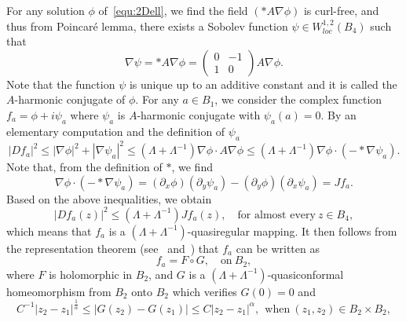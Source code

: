 \documentclass[a4paper,reqno]{amsart}
\theoremstyle{definition}
\numberwithin{equation}{section}
\begin{document}
    For any solution $\phi$ of~\eqref{equ:2Dell}, we find  the field $(*A\nabla \phi)$ is curl-free, and thus from Poincar\'e lemma, there exists a Sobolev function $\psi\in W_{loc}^{1,2}(B_{4})$ such that 
    \begin{equation*}
        \nabla \psi= *A\nabla \phi=\begin{pmatrix}
            0 &-1\\
            1 &0
        \end{pmatrix}A\nabla \phi.
        \end{equation*}
    Note that the function $\psi$ is unique up to an additive constant and it is called the $A$-harmonic conjugate of $\phi$.
    For any $a\in B_{1}$,
    we consider the complex function $f_{a}=\phi+i\psi_{a}$ where $\psi_{a}$ is $A$-harmonic conjugate with $\psi_{a}(a)=0$. By an elementary computation and the definition of $\psi_{a}$
    \begin{equation*}
        |Df_{a}|^{2}\le |\nabla \phi|^{2}+|\nabla \psi_{a}|^{2}\le \left(\Lambda+\Lambda^{-1}\right)\nabla \phi\cdot A\nabla \phi
        \le \left(\Lambda+\Lambda^{-1}\right)\nabla \phi\cdot (-*\nabla \psi_{a}).    \end{equation*}
        Note that, from the definition of $*$, we find
        \begin{equation*}
        \nabla \phi\cdot (-*\nabla \psi_{a})=(\partial_{x}\phi)(\partial_{y}\psi_{a})-(\partial_{y}\phi)(\partial_{x}\psi_{a})=
        Jf_{a}.
        \end{equation*}
        Based on the above inequalities, we obtain
        \begin{equation*}
            |Df_{a}(z)|^{2}\le (\Lambda+\Lambda^{-1})Jf_{a}(z),\quad \mbox{for almost every}\ z\in B_{4},
        \end{equation*}
        which means that $f_{a}$ is a $(\Lambda+\Lambda^{-1})$-quasiregular mapping. It then follows from the representation theorem (see~\cite[Section 2]{AEESAIM} and~\cite[Corollary 5.5.3]{AIM}) that $f_{a}$ can be written as
        \begin{equation*}
            f_{a}=F\circ G,\quad \mbox{on}\ B_{2},
        \end{equation*}
        where $F$ is holomorphic in $B_{2}$, and $G$ is a $(\Lambda+\Lambda^{-1})$-quasiconformal homeomorphism from $B_{2}$ onto $B_{2}$ which verifies $G(0)=0$ and 
        \begin{equation}\label{est:Holder}
            C^{-1}|z_{2}-z_{1}|^{\frac{1}{\alpha}}\le 
            |G(z_{2})-G({z_{1}})|\le C|z_{2}-z_{1}|^{\alpha},\ \ \mbox{when}\ (z_{1},z_{2})\in B_{2}\times B_{2},
        \end{equation}
\end{document}
